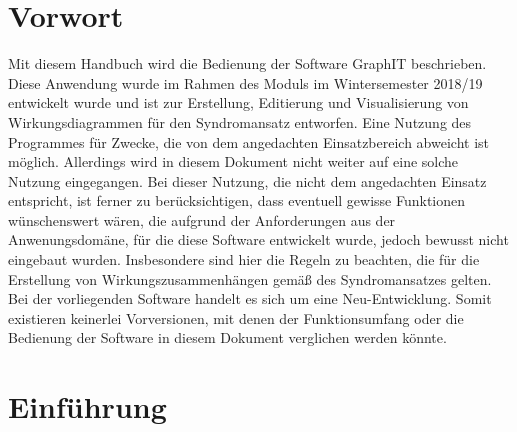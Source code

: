 \documentclass[enabledeprecatedfontcommands,fontsize=11pt,paper=a4,twoside]{scrartcl}
\newcounter{one}
\newcounter{two}[one]
\renewcommand{\headrulewidth}{0pt}
\begin{document}


\newpage

  \thispagestyle{fancy}
  \fancyhead{}
  
  \fancyfoot{}
  \renewcommand{\headrulewidth}{0.4pt}
  \tableofcontents

\newpage


\section*{Vorwort}
Mit diesem Handbuch wird die Bedienung der Software GraphIT beschrieben. Diese Anwendung wurde im Rahmen des Moduls  \grqq im Wintersemester 2018/19 entwickelt wurde und ist zur Erstellung, Editierung und Visualisierung von Wirkungsdiagrammen für den Syndromansatz entworfen. Eine Nutzung des Programmes für Zwecke, die von dem angedachten Einsatzbereich abweicht ist möglich. Allerdings wird in diesem Dokument nicht weiter auf eine solche Nutzung eingegangen. Bei dieser Nutzung, die nicht dem angedachten Einsatz entspricht, ist ferner zu berücksichtigen, dass eventuell gewisse Funktionen wünschenswert wären, die aufgrund der Anforderungen aus der Anwenungsdomäne, für die diese Software entwickelt wurde, jedoch bewusst nicht eingebaut wurden. Insbesondere sind hier die Regeln zu beachten, die für die Erstellung von Wirkungszusammenhängen gemäß des Syndromansatzes gelten. Bei der vorliegenden Software handelt es sich um eine Neu-Entwicklung. Somit existieren keinerlei Vorversionen, mit denen der Funktionsumfang oder die Bedienung der Software in diesem Dokument verglichen werden könnte. 

\section{Einführung}
\end{document}

